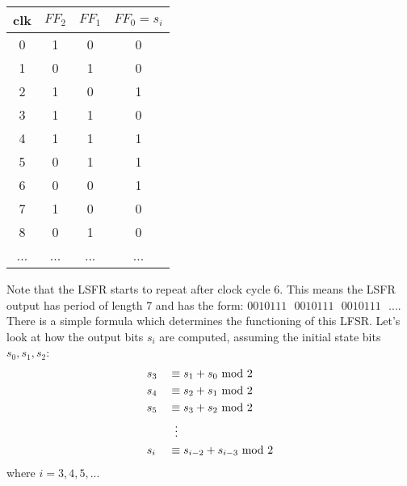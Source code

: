 \begin{center}
    \begin{tabular}{|c|c|c|c|}
         \hline
         clk&$FF_2$&$FF_1$&$FF_0=s_i$\\
         \hline
         0&1&0&0\\
         1&0&1&0\\
         2&1&0&1\\
         3&1&1&0\\
         4&1&1&1\\
         5&0&1&1\\
         6&0&0&1\\
         7&1&0&0\\
         8&0&1&0\\
         ...&...&...&...\\
         \hline
    \end{tabular}
\end{center}
Note that the LSFR starts to repeat after clock cycle 6. This means the LSFR output has period of length 7 and has the form: $0010111\text{ }0010111\text{ }0010111\text{ }...$. There is a simple formula which determines the functioning of this LFSR. Let's look at how the output bits $s_i$ are computed, assuming the initial state bits $s_0,s_1,s_2$:
\begin{alignat*}{2}
    &s_3&&\equiv s_1+s_0\text{ mod }2\\
    &s_4&&\equiv s_2+s_1\text{ mod }2\\
    &s_5&&\equiv s_3+s_2\text{ mod }2\\
    &   &&\hspace{0.2cm}\vdots\\
    &s_{i}&&\equiv s_{i-2}+s_{i-3}\text{ mod }2
\end{alignat*}
where $i=3,4,5,...$

\newpage
